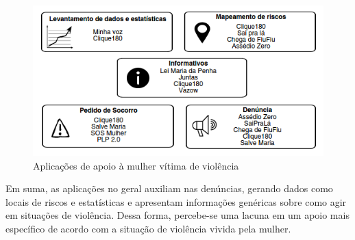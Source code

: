 \begin{figure}[h!]
\centering
\includegraphics[scale=0.75]{figuras/sistemas_relacionados.png}
\caption{Aplicações de apoio à mulher vítima de violência}
\label{fig:sistemas_categorizados}
\end{figure}

Em suma, as aplicações no geral auxiliam nas denúncias, gerando dados como locais de riscos e estatísticas e
apresentam informações genéricas sobre como agir em situações de violência. Dessa forma, percebe-se uma lacuna em um apoio mais específico de acordo com a situação de violência vivida pela mulher.




